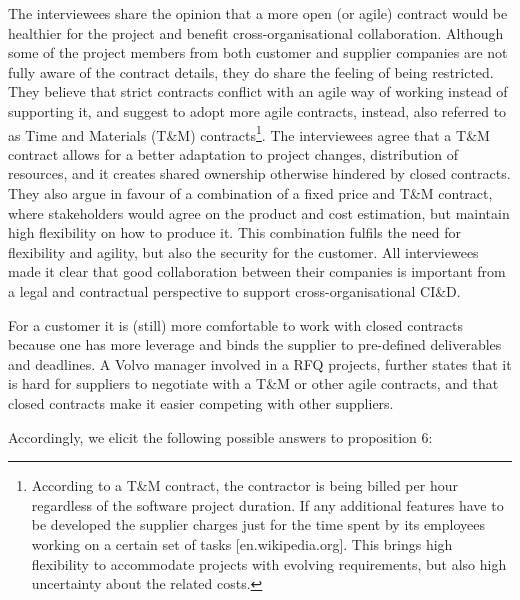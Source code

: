  The interviewees share the opinion that a more open (or agile) contract would be healthier for the project and benefit cross-organisational collaboration. Although some of the project members from both customer and supplier companies are not fully aware of the contract details, they do share the feeling of being restricted. They believe that strict contracts conflict with an agile way of working instead of supporting it, and suggest to adopt more agile contracts, instead, also referred to as Time and Materials (T\&M) contracts\footnote{According to a T\&M contract, the contractor is being billed per hour regardless of the software project duration. If any additional features have to be developed the supplier charges just for the time spent by its employees working on a certain set of tasks [en.wikipedia.org]. This brings high flexibility to accommodate projects with evolving requirements, but also high uncertainty about the related costs.}. 
The interviewees agree that a T\&M contract allows for a better adaptation to project changes, distribution of resources, and it creates shared ownership otherwise hindered by closed contracts. They also argue in favour of a combination of a fixed price and T\&M contract, where stakeholders would agree on the product and cost estimation, but maintain high flexibility on how to produce it. This combination fulfils the need for flexibility and agility, but also the security for the customer. All interviewees made it clear that good collaboration between their companies is important from a legal and contractual perspective to support cross-organisational CI\&D.

 For a customer it is (still) more comfortable to work with closed contracts because one has more leverage and binds the supplier to pre-defined deliverables and deadlines. A Volvo manager involved in a RFQ projects, further states that it is hard for suppliers to negotiate with a T\&M or other agile contracts, and that closed contracts make it easier competing with other suppliers.

Accordingly, we elicit the following possible answers to proposition 6:

